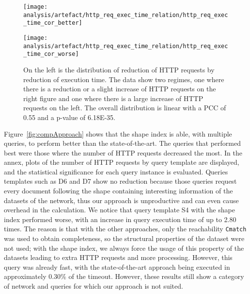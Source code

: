 \begin{figure}[htbp]
    \centering
    \begin{minipage}[t]{0.45\textwidth}
        \centering
        \texttt{[image: analysis/artefact/http\_req\_exec\_time\_relation/http\_req\_exec\_time\_cor\_better]}
        \label{fig:http_req_exec_time_cor_better}
    \end{minipage}
    \hspace{0.05\textwidth}
    \begin{minipage}[t]{0.45\textwidth}
        \centering
        \texttt{[image: analysis/artefact/http\_req\_exec\_time\_relation/http\_req\_exec\_time\_cor\_worse]}
        \label{fig:http_req_exec_time_cor_worse}
    \end{minipage}

    \caption{On the left is the distribution of reduction of HTTP requests by reduction of execution time.
    The data show two regimes, one where there is a reduction or a slight increase of HTTP requests on the right figure and one where there is a large increase of HTTP requests on the left.
    The overall distribution is linear with a PCC of 0.55 and a p-value of 6.18E-35.}
    \label{fig:http_req_exec_time_cor}
\end{figure}

Figure~\ref{fig:compApproach} shows that the shape index is able, with multiple queries, to perform better than the state-of-the-art.
The queries that performed best were those where the number of HTTP requests decreased the most.
In the annex, plots of the number of HTTP requests by query template are displayed, and the statistical significance for each query instance is evaluated.
Queries templates such as D6 and D7 show no reduction because those queries request every document following the shape containing interesting information of the datasets of the network, thus
our approach is unproductive and can even cause overhead in the calculation.
We notice that query template S4 with the shape index performed worse, with an increase in query execution time of up to 2.80 times.
The reason is that with the other approaches, only the reachability \texttt{Cmatch} was used to obtain completeness, so the structural properties of the dataset were not used; with the shape index, we always force the usage of this property of the datasets leading to extra HTTP requests and more processing.
However, this query was already fast, with the state-of-the-art approach being executed in approximately 0.30\% of the timeout.
However, these results still show a category of network and queries for which our approach is not suited.

